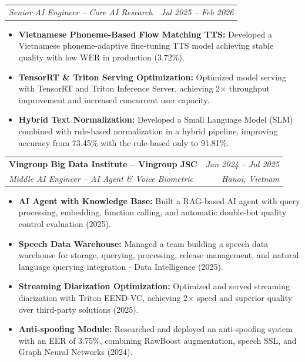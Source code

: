 \documentclass[10pt,a4paper]{article}
\makeatletter
\newcommand{\cventry}[4]{%
  \noindent
  \begin{tabular*}{\linewidth}{@{}l@{\extracolsep{\fill}}r@{}}
    {\color{accent}\textbf{#1}} & \textit{\small #2} \\
    \textit{\small #3} & \textit{\small #4}
  \end{tabular*}%
  \vspace{1pt}%
}
\newcommand{\cvsubrole}[2]{%
  \noindent
  \begin{tabular*}{\linewidth}{@{}l@{\extracolsep{\fill}}r@{}}
    \textit{\small #1} & \textit{\small #2}
  \end{tabular*}%
  \vspace{1pt}%
}
\makeatother
\begin{document}
\vspace{2pt}
\cvsubrole{Senior AI Engineer -- Core AI Research}{Jul 2025 -- Feb 2026}
\begin{itemize}
  \item \textbf{Vietnamese Phoneme-Based Flow Matching TTS:} Developed a Vietnamese phoneme-adaptive fine-tuning TTS model achieving stable quality with low WER in production (3.72\%).
  \item \textbf{TensorRT \& Triton Serving Optimization:} Optimized model serving with TensorRT and Triton Inference Server, achieving 2$\times$ throughput improvement and increased concurrent user capacity.
  \item \textbf{Hybrid Text Normalization:} Developed a Small Language Model (SLM) combined with rule-based normalization in a hybrid pipeline, improving accuracy from 73.45\% with the rule-based only to 91.81\%.
\end{itemize}

\vspace{3pt}

\cventry{Vingroup Big Data Institute -- Vingroup JSC}{Jan 2024 -- Jul 2025}
        {Middle AI Engineer -- AI Agent \& Voice Biometric}{Hanoi, Vietnam}
\begin{itemize}
  \item \textbf{AI Agent with Knowledge Base:} Built a RAG-based AI agent with query processing, embedding, function calling, and automatic double-bot quality control evaluation (2025).
  \item \textbf{Speech Data Warehouse:} Managed a team building a speech data warehouse for storage, querying, processing, release management, and natural language querying integration - Data Intelligence (2025).
  \item \textbf{Streaming Diarization Optimization:} Optimized and served streaming diarization with Triton EEND-VC, achieving 2$\times$ speed and superior quality over third-party solutions (2025).
  \item \textbf{Anti-spoofing Module:} Researched and deployed an anti-spoofing system with an EER of 3.75\%, combining RawBoost augmentation, speech SSL, and Graph Neural Networks (2024).
\end{itemize}
\end{document}
